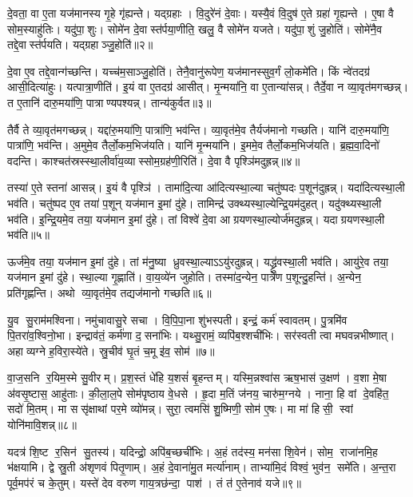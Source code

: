 दे॒वता॒ वा ए॒ता यज॑मानस्य गृ॒हे गृ॑ह्यन्ते। यद्ग्रहाः। वि॒दुरे॑नं दे॒वाः। यस्यै॒वं वि॒दुष॑ ए॒ते ग्रहा॑ गृ॒ह्यन्ते। ए॒षा वै सोम॒स्याहु॑तिः। यदु॑पा॒शुः। सोमे॑न दे॒वास्त॑र्पया॒णीति॒ खलु॒ वै सोमे॑न यजते। यदु॑पा॒शुं जु॒होति॑। सोमे॑नै॒व तद्दे॒वास्त॑र्पयति। यद्ग्रहाञ्जु॒होति॑॥२॥

दे॒वा ए॒व तद्दे॒वान्ग॑च्छन्ति। यच्च॑म॒साञ्जु॒होति॑। तेनै॒वानु॑रूपेण॒ यज॑मानस्सुव॒र्गं लो॒कमे॑ति। किं न्वे॑तदग्र॑ आसी॒दित्या॑हुः। यत्पात्रा॒णीति॑। इ॒यं वा ए॒तदग्र॑ आसीत्। मृ॒न्मया॑नि॒ वा ए॒तान्या॑सन्न्। तैर्दे॒वा न व्या॒वृत॑मगच्छन्न्। त ए॒तानि॑ दारु॒मया॑णि॒ पात्राण्यपश्यन्न्। तान्य॑कुर्वत॥३॥

तैर्वै ते व्या॒वृत॑मगच्छन्न्। यद्दा॑रु॒मया॑णि॒ पात्रा॑णि॒ भव॑न्ति। व्या॒वृत॑मे॒व तैर्यज॑मानो गच्छति। यानि॑ दारु॒मया॑णि॒ पात्रा॑णि॒ भव॑न्ति। अ॒मुमे॒व तैर्लो॒कम॒भिज॑यति। यानि॑ मृ॒न्मया॑नि। इ॒ममे॒व तैर्लो॒कम॒भिज॑यति। ब्र॒ह्म॒वा॒दिनो॑ वदन्ति। काश्चत॑स्रस्स्था॒लीर्वा॑य॒व्यास्सोम॒ग्रह॑णी॒रिति॑। दे॒वा वै पृश्ञि॑मदुह्रन्न्॥४॥

तस्या॑ ए॒ते स्तना॑ आसन्न्। इ॒यं वै पृश्ञि॑। तामा॑दि॒त्या आ॑दित्यस्था॒ल्या चतु॑ष्पदः प॒शून॑दुह्रन्न्। यदा॑दित्यस्था॒ली भव॑ति। चतु॑ष्पद ए॒व तया॑ प॒शून् यज॑मान इ॒मां दु॑हे। तामिन्द्र॑ उक्थ्यस्था॒ल्येन्द्रि॒यम॑दुहत्। यदु॑क्थ्यस्था॒ली भव॑ति। इ॒न्द्रि॒यमे॒व तया॒ यज॑मान इ॒मां दु॑हे। तां विश्वे॑ दे॒वा आग्रयणस्था॒ल्योर्ज॑मदुह्रन्न्। यदाग्रयणस्था॒ली भव॑ति॥५॥

ऊर्ज॑मे॒व तया॒ यज॑मान इ॒मां दु॑हे। तां म॑नु॒ष्या ध्रुवस्था॒ल्याऽऽयु॑रदुह्रन्न्। यद्ध्रु॑वस्था॒ली भव॑ति। आयु॑रे॒व तया॒ यज॑मान इ॒मां दु॑हे। स्था॒ल्या गृ॒ह्णाति॑। वा॒य॒व्ये॑न जुहोति। तस्मा॑द॒न्येन॒ पात्रे॑ण प॒शून्दु॒हन्ति॑। अ॒न्येन॒ प्रति॑गृह्णन्ति। अथो व्या॒वृत॑मे॒व तद्यज॑मानो गच्छति॥६॥\anuvakamend[ग्र॒ह॒त्वं ग्रहाञ्जु॒होत्य॑कुर्वतादुह्रन्नाग्रयणस्था॒ली भव॑ति॒ नव॑ च]

यु॒व सु॒राम॑मश्विना। नमु॑चावासु॒रे सचा। वि॒पि॒पा॒ना शु॑भस्पती। इन्द्रं॒ कर्म॑ स्वावतम्। पु॒त्रमि॑व पि॒तरा॑व॒श्विनो॒भा। इन्द्राव॑तं॒ कर्म॑णा द॒सना॑भिः। यथ्सु॒रामं॒ व्यपि॑ब॒श्शची॑भिः। सर॑स्वती त्वा मघवन्नभीष्णात्। अहाव्यग्ने ह॒विरा॒स्ये॑ते। स्रु॒चीव॑ घृ॒तं च॒मू इ॑व॒ सोम॑॥७॥

वा॒ज॒सनि र॒यिम॒स्मे सु॒वीरम्। प्र॒श॒स्तं धे॑हि य॒शसं॑ बृ॒हन्तम्। यस्मि॒न्नश्वा॑स ऋष॒भास॑ उ॒क्षण॑। व॒शा मे॒षा अ॑वसृ॒ष्टास॒ आहु॑ताः। की॒ला॒ल॒पे सोम॑पृष्ठाय वे॒धसे। हृ॒दा म॒तिं ज॑नय॒ चारु॑म॒ग्नये। नाना॒ हि वां दे॒वहि॑त॒ सदो॑ मि॒तम्। मा ससृ॑क्षाथां पर॒मे व्यो॑मन्न्। सुरा॒ त्वमसि॑ शु॒ष्मिणी॒ सोम॑ ए॒षः। मा मा॑ हिसी॒ स्वां योनि॑मावि॒शन्न्॥८॥

यदत्र॑ शि॒ष्ट र॒सिन॑ सु॒तस्य॑। यदिन्द्रो॒ अपि॑ब॒च्छची॑भिः। अ॒हं तद॑स्य॒ मन॑सा शि॒वेन॑। सोम॒ राजा॑नमि॒ह भ॑क्षयामि। द्वे स्रु॒ती अ॑शृणवं पितृ॒णाम्। अ॒हं दे॒वाना॑मु॒त मर्त्या॑नाम्। ताभ्या॑मि॒दं विश्वं॒ भुव॑न॒ समे॑ति। अ॒न्त॒रा पूर्व॒मप॑रं च के॒तुम्। यस्ते॑ देव वरुण गाय॒त्रछ॑न्दा॒ पाश॑। तं त॑ ए॒तेनाव॑ यजे॥९॥

